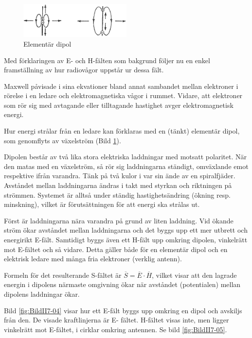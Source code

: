 \begin{figure}
\includegraphics[width=0.5\textwidth]{images/cropped_pdfs/bild_2_7-03.pdf}
\caption{Elementär dipol}
\label{fig:BildII7-03}
\end{figure}

Med förklaringen av E- och H-fälten som bakgrund följer nu en enkel
framställning av hur radiovågor uppstår ur dessa fält.

Maxwell påvisade i sina ekvationer bland annat sambandet mellan elektroner
i rörelse i en ledare och elektromagnetiska vågor i rummet.
Vidare, att elektroner som rör sig med avtagande eller tilltagande hastighet
avger elektromagnetisk energi.

Hur energi strålar från en ledare kan förklaras med en (tänkt)
elementär dipol, som genomflyts av växelström (Bild \ref{fig:BildII7-03}).

Dipolen består av två lika stora elektriska laddningar med motsatt polaritet.
När den matas med en växelström, så rör sig laddningarna ständigt,
omväxlande emot respektive ifrån varandra.
Tänk på två kulor i var sin ände av en spiralfjäder.
Avståndet mellan laddningarna ändras i takt med styrkan och riktningen på
strömmen.
Systemet är alltså under ständig hastighetsändring (ökning resp. minskning),
vilket är förutsättningen för att energi ska strålas ut.

Först är laddningarna nära varandra på grund av liten laddning.
Vid ökande ström ökar avståndet mellan laddningarna och det byggs upp ett
mer utbrett och energirikt E-fält.
Samtidigt byggs även ett H-fält upp omkring dipolen, vinkelrätt mot E-fältet
och så vidare.
Detta gäller både för en elementär dipol och en elektrisk ledare med många fria
elektroner (verklig antenn).

Formeln för det resulterande S-fältet är \(\overline{S} =
\overline{E}\cdot\overline{H}\), vilket visar att den lagrade energin
i dipolens närmaste omgivning ökar när avståndet (potentialen) mellan
dipolens laddningar ökar.

Bild \ref{fig:BildII7-04} visar hur ett E-fält byggs upp omkring en dipol och
avskiljs från den.
De visade kraftlinjerna är E- fältet.
H-fältet visas inte, men ligger vinkelrätt mot E-fältet, i cirklar omkring
antennen. Se bild \ref{fig:BildII7-05}.

